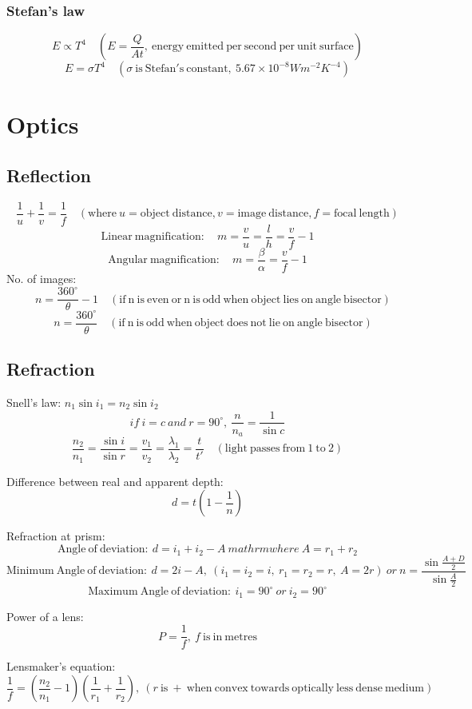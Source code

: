 \documentclass{article}
\begin{document}
\subsubsection*{Stefan's law}
\[E \propto T^4\quad (E=\frac{Q}{At}\mathrm{,\ energy\ emitted\ per\ second\ per\ unit\ surface})\]
\[E=\sigma T^4 \quad (\sigma\mathrm{\ is\ Stefan's\ constant,\ }5.67\times10^{-8}Wm^{-2}K^{-4})\]


\section{Optics}
\subsection*{Reflection}

\[\frac{1}{u} + \frac{1}{v} = \frac{1}{f}\quad(\mathrm{where}\ u=\mathrm{object\ distance}, v=\mathrm{image\ distance}, f=\mathrm{focal\ length} )\]
\[\mathrm{Linear\ magnification:}\quad m=\frac{v}{u}=\frac{l}{h}=\frac{v}{f}-1\]
\[\mathrm{Angular\ magnification:}\quad m=\frac{\beta}{\alpha}=\frac{v}{f}-1\]
No. of images:
\[\quad n=\frac{360^\circ}{\theta}-1\quad(\mathrm{if\ n\ is\ even\ or\ n\ is\ odd\ when\ object\ lies\ on\ angle\ bisector})\]
\[\quad n=\frac{360^\circ}{\theta}\quad(\mathrm{if\ n\ is\ odd\ when\ object\ does\ not\ lie\ on\ angle\ bisector})\]

\subsection*{Refraction}

Snell's law: \(n_1\sin i_1=n_2\sin i_2\)
\[if\ i=c\ and\ r=90^\circ,\ \frac{n}{n_a}=\frac{1}{\sin c}\]
\[\frac{n_2}{n_1}=\frac{\sin i}{\sin r}=\frac{v_1}{v_2}=\frac{\lambda_1}{\lambda_2}=\frac{t}{t'}\quad(\mathrm{light\ passes\ from\ 1\ to\ 2})\]

Difference between real and apparent depth:
\[d=t(1-\frac{1}{n})\]

Refraction at prism:
\[\mathrm{Angle\ of\ deviation:\ }d=i_1+i_2-A\ mathrm{where}\ A=r_1+r_2\]
\[\mathrm{Minimum\ Angle\ of\ deviation:\ }d=2i-A,\ (i_1=i_2=i,\ r_1=r_2=r,\ A=2r)\ or\ n=\frac{\sin\frac{A+D}{2}}{\sin\frac{A}{2}}\]
\[\mathrm{Maximum\ Angle\ of\ deviation:\ }i_1=90^\circ\ or\ i_2=90^\circ\]

Power of a lens:
\[P=\frac{1}{f},\ f\ \mathrm{is\ in\ metres}\]

Lensmaker's equation:
\[\frac{1}{f}=(\frac{n_2}{n_1}-1)(\frac{1}{r_1}+\frac{1}{r_2}),\ (r\ \mathrm{is\ +\ when\ convex\ towards\ optically\ less\ dense\ medium})\]
\end{document}
